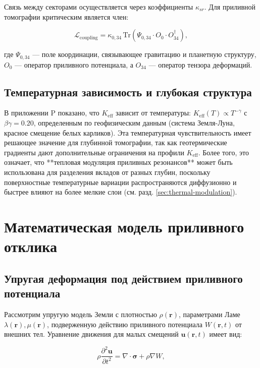 \documentclass[12pt,a4paper]{article}
\theoremstyle{remark}
\newcommand{\Keff}{K_{\mathrm{eff}}}
\begin{document}
	Связь между секторами осуществляется через коэффициенты $\kappa_{sr}$. Для приливной томографии критическим является член:
	
	\begin{equation}
		\mathcal{L}_{\text{coupling}} = \kappa_{0,34} \, \mathrm{Tr}\left(\Psi_{0,34} \cdot O_0 \cdot O_{34}^\dagger\right),
		\label{eq:coupling}
	\end{equation}
	
	где $\Psi_{0,34}$ — поле координации, связывающее гравитацию и планетную структуру, $O_0$ — оператор приливного потенциала, а $O_{34}$ — оператор тензора деформаций.
	
	\subsection{Температурная зависимость и глубокая структура}
	
	В приложении P показано, что $\Keff$ зависит от температуры: $\Keff(T) \propto T^{-\gamma}$ с $\beta\gamma = 0.20$, определенным по геофизическим данным (система Земля-Луна, красное смещение белых карликов). Эта температурная чувствительность имеет решающее значение для глубинной томографии, так как геотермические градиенты дают дополнительные ограничения на профили $K_{\mathrm{eff}}$. Более того, это означает, что **тепловая модуляция приливных резонансов** может быть использована для разделения вкладов от разных глубин, поскольку поверхностные температурные вариации распространяются диффузионно и быстрее влияют на более мелкие слои (см. разд. \ref{sec:thermal-modulation}).
	
	\section{Математическая модель приливного отклика}
	\label{sec:model}
	
	\subsection{Упругая деформация под действием приливного потенциала}
	
	Рассмотрим упругую модель Земли с плотностью $\rho(\mathbf{r})$, параметрами Ламе $\lambda(\mathbf{r}), \mu(\mathbf{r})$, подверженную действию приливного потенциала $W(\mathbf{r},t)$ от внешних тел. Уравнение движения для малых смещений $\mathbf{u}(\mathbf{r},t)$ имеет вид:
	
	\begin{equation}
		\rho \frac{\partial^2 \mathbf{u}}{\partial t^2} = \nabla \cdot \boldsymbol{\sigma} + \rho \nabla W,
		\label{eq:motion}
	\end{equation}
	
\end{document}
